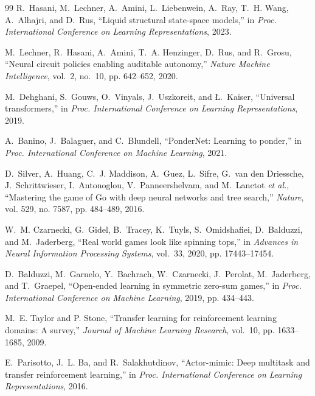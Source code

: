 \documentclass[conference]{IEEEtran}
\begin{document}
\begin{thebibliography}{99}
R.~Hasani, M.~Lechner, A.~Amini, L.~Liebenwein, A.~Ray, T.~H. Wang, A.~Alhajri, and D.~Rus, ``Liquid structural state-space models,'' in \emph{Proc. International Conference on Learning Representations}, 2023.

M.~Lechner, R.~Hasani, A.~Amini, T.~A. Henzinger, D.~Rus, and R.~Grosu, ``Neural circuit policies enabling auditable autonomy,'' \emph{Nature Machine Intelligence}, vol.~2, no.~10, pp. 642--652, 2020.

M.~Dehghani, S.~Gouws, O.~Vinyals, J.~Uszkoreit, and {\L}.~Kaiser, ``Universal transformers,'' in \emph{Proc. International Conference on Learning Representations}, 2019.

A.~Banino, J.~Balaguer, and C.~Blundell, ``PonderNet: Learning to ponder,'' in \emph{Proc. International Conference on Machine Learning}, 2021.

D.~Silver, A.~Huang, C.~J. Maddison, A.~Guez, L.~Sifre, G.~van den Driessche, J.~Schrittwieser, I.~Antonoglou, V.~Panneershelvam, and M.~Lanctot \emph{et al.}, ``Mastering the game of Go with deep neural networks and tree search,'' \emph{Nature}, vol. 529, no. 7587, pp. 484--489, 2016.

W.~M. Czarnecki, G.~Gidel, B.~Tracey, K.~Tuyls, S.~Omidshafiei, D.~Balduzzi, and M.~Jaderberg, ``Real world games look like spinning tops,'' in \emph{Advances in Neural Information Processing Systems}, vol.~33, 2020, pp. 17443--17454.

D.~Balduzzi, M.~Garnelo, Y.~Bachrach, W.~Czarnecki, J.~Perolat, M.~Jaderberg, and T.~Graepel, ``Open-ended learning in symmetric zero-sum games,'' in \emph{Proc. International Conference on Machine Learning}, 2019, pp. 434--443.

M.~E. Taylor and P. Stone, ``Transfer learning for reinforcement learning domains: A survey,'' \emph{Journal of Machine Learning Research}, vol.~10, pp. 1633--1685, 2009.

E.~Parisotto, J.~L. Ba, and R.~Salakhutdinov, ``Actor-mimic: Deep multitask and transfer reinforcement learning,'' in \emph{Proc. International Conference on Learning Representations}, 2016.


\end{thebibliography}
\end{document}
